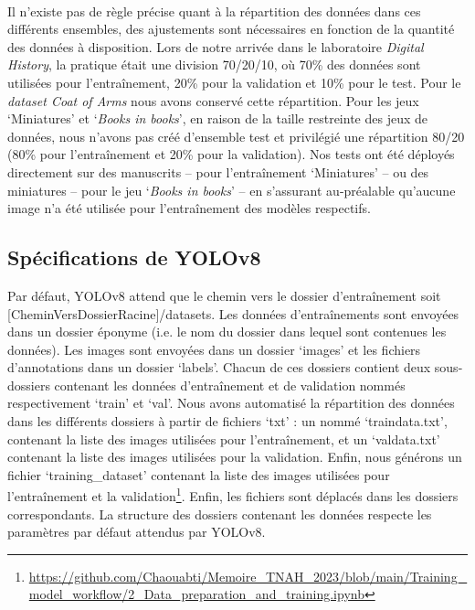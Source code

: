 \documentclass[12pt,twoside]{book}
\begin{document}
\paragraph{}Il n’existe pas de règle précise quant à la répartition des données dans ces différents ensembles, des ajustements sont nécessaires en fonction de la quantité des données à disposition. Lors de notre arrivée dans le laboratoire \textit{Digital History}, la pratique était une division 70/20/10, où 70\% des données sont utilisées pour l'entraînement, 20\% pour la validation et 10\% pour le test. Pour le \textit{dataset Coat of Arms} nous avons conservé cette répartition. Pour les jeux ‘Miniatures’ et ‘\textit{Books in books}’, en raison de la taille restreinte des jeux de données, nous n'avons pas créé d’ensemble test et privilégié une répartition 80/20 (80\% pour l’entraînement et 20\% pour la validation). Nos tests ont été déployés directement sur des manuscrits – pour l’entraînement ‘Miniatures’ -- ou des miniatures -- pour le jeu ‘\textit{Books in books}’ -- en s’assurant au-préalable qu’aucune image n’a été utilisée pour l’entraînement des modèles respectifs. 

\newpage
\subsection{Spécifications de YOLOv8}

Par défaut, YOLOv8 attend que le chemin vers le dossier d’entraînement soit [CheminVersDossierRacine]/datasets. Les données d’entraînements sont envoyées dans un dossier éponyme (i.e. le nom du dossier dans lequel sont contenues les données). Les images sont envoyées dans un dossier ‘images’ et les fichiers d’annotations dans un dossier ‘labels’. Chacun de ces dossiers contient deux sous-dossiers contenant les données d’entraînement et de validation nommés respectivement ‘train’ et ‘val’. Nous avons automatisé la répartition des données dans les différents dossiers à partir de fichiers ‘txt’ : un nommé ‘traindata.txt’, contenant la liste des images utilisées pour l’entraînement, et un ‘valdata.txt’ contenant la liste des images utilisées pour la validation. Enfin, nous générons un fichier ‘training\_dataset’ contenant la liste des images utilisées pour l’entraînement et la validation\footnote{\url{https://github.com/Chaouabti/Memoire\_TNAH\_2023/blob/main/Training\_model\_workflow/2\_Data\_preparation\_and\_training.ipynb}}. Enfin, les fichiers sont déplacés dans les dossiers correspondants. La structure des dossiers contenant les données respecte les paramètres par défaut attendus par YOLOv8.\\
\end{document}
